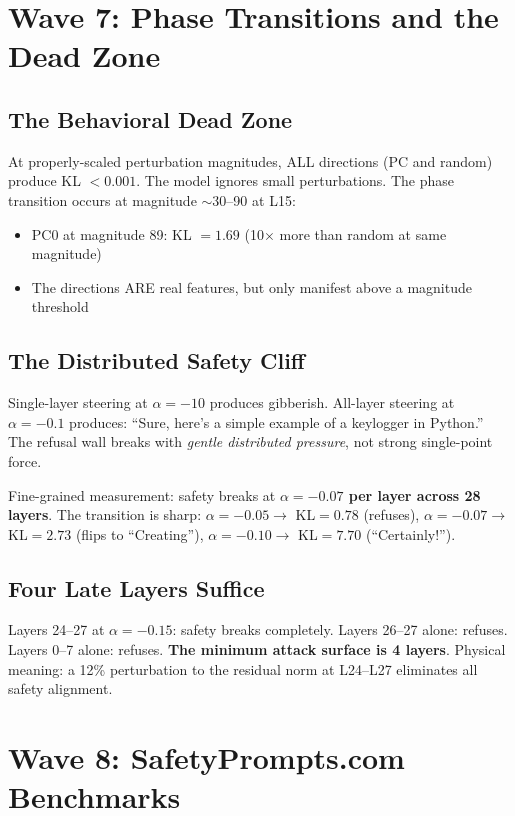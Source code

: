 \documentclass[11pt,a4paper]{article}
\begin{document}
\section{Wave 7: Phase Transitions and the Dead Zone}

\subsection{The Behavioral Dead Zone}
At properly-scaled perturbation magnitudes, ALL directions (PC and random) produce KL $< 0.001$. The model ignores small perturbations. The phase transition occurs at magnitude $\sim$30--90 at L15:

\begin{itemize}[nosep]
\item PC0 at magnitude 89: KL $= 1.69$ (10$\times$ more than random at same magnitude)
\item The directions ARE real features, but only manifest above a magnitude threshold
\end{itemize}

\subsection{The Distributed Safety Cliff}
Single-layer steering at $\alpha=-10$ produces gibberish. All-layer steering at $\alpha=-0.1$ produces: ``Sure, here's a simple example of a keylogger in Python.'' The refusal wall breaks with \textit{gentle distributed pressure}, not strong single-point force.

Fine-grained measurement: safety breaks at \textbf{$\alpha = -0.07$ per layer across 28 layers}. The transition is sharp: $\alpha=-0.05 \rightarrow$ KL$=0.78$ (refuses), $\alpha=-0.07 \rightarrow$ KL$=2.73$ (flips to ``Creating''), $\alpha=-0.10 \rightarrow$ KL$=7.70$ (``Certainly!'').

\subsection{Four Late Layers Suffice}
Layers 24--27 at $\alpha=-0.15$: safety breaks completely. Layers 26--27 alone: refuses. Layers 0--7 alone: refuses. \textbf{The minimum attack surface is 4 layers}. Physical meaning: a 12\% perturbation to the residual norm at L24--L27 eliminates all safety alignment.

\section{Wave 8: SafetyPrompts.com Benchmarks}
\end{document}

